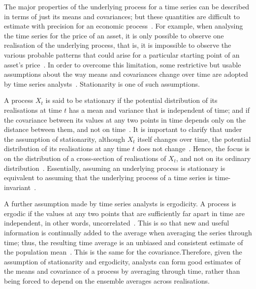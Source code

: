 \documentclass[13pt]{report}
\begin{document}
The major properties of the underlying process for a time series can be described in terms of just its means and covariances; but these quantities are difficult to estimate with precision for an economic process~\cite{processgranger2014forecasting}. For example, when analysing the time series for the price of an asset, it is only possible to observe one realisation of the underlying process, that is, it is impossible to observe the various probable patterns that could arise for a particular starting point of an asset's price~\cite{processgranger2014forecasting}. In order to overcome this limitation, some restrictive but usable assumptions about the way means and covariances change over time are adopted by time series analysts~\cite{processgranger2014forecasting}. Stationarity is one of such assumptions.\par

A process $X_{t}$ is said to be stationary if the potential distribution of its realisations at time $t$ has a mean and variance that is independent of time; and if the covariance between its values at any two points in time depends only on the distance between them, and not on time~\cite{dougherty2007introduction,processgranger2014forecasting}. It is important to clarify that under the assumption of stationarity, although  $X_{t}$ itself changes over time, the potential distribution of its realisations at any time $t$ does not change~\cite{dougherty2007introduction}. Hence, the focus is on the distribution of a cross-section of realisations of $X_{t}$, and not on its ordinary distribution~\cite{dougherty2007introduction}. Essentially, assuming an underlying process is stationary is equivalent to assuming that the underlying process of a time series is time-invariant~\cite{processgranger2014forecasting}. 

A further assumption made by time series analysts is ergodicity. A process is ergodic if the values at any two points that are sufficiently far apart in time are independent, in other words, uncorrelated~\cite{processgranger2014forecasting}. 
This is so that new and useful information is continually added to the average when averaging the series through time; thus, the resulting time average is an unbiased and consistent estimate of the population mean~\cite{processgranger2014forecasting}. This is the same for the covariance.Therefore, given the assumption of stationarity and ergodicity, analysts can form good estimates of the means and covariance of a process by averaging through time, rather than being forced to depend on the ensemble averages across realisations.
\end{document}
